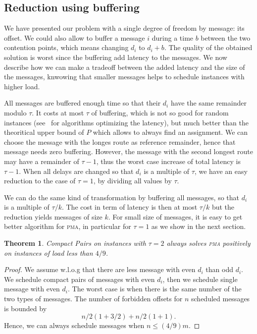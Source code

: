 \documentclass[10pt, conference, letterpaper]{IEEEtran}
\newtheorem{theorem}{Theorem}
\newcommand\pma{\textsc{pma}\xspace}
\begin{document}
\subsection{Reduction  using buffering}

We have presented our problem with a single degree of freedom by message: its
offset. We could also allow to buffer a message $i$ during a time $b$ between the two contention points, which means changing $d_i$ to $d_i + b$. The quality of the obtained solution is worst since the buffering add latency to the messages. We now describe how we can make a tradeoff between the added latency and the size of the messages, knwowing that smaller messages helps to schedule instances with higher load.


All messages are buffered enough time so that their $d_i$ have the same
remainder modulo $\tau$. It costs at most $\tau$ of buffering, which is not
so good for random instances (see~\cite{barth2018deterministic} for algorithms optimizing the latency), but much better than the theoritical upper bound of $P$ which allows to always find an assignment. We can choose the message with the longes route as reference remainder, hence that message needs zero buffering. However, the message with the second longest route may have a remainder of $\tau -1$, thus the worst case increase of total latency is $\tau -1$. When all delays are changed so that $d_i$ is a multiple of $\tau$, we have an
easy reduction to the case of $\tau = 1$, by dividing all values by $\tau$.

We can do the same kind of transformation by buffering all 
messages, so that $d_i$ is a multiple of $\tau / k$. The cost in term
of latency is then at most $\tau / k$ but the reduction yields messages of size $k$.
For small size of messages, it is easy to get better algorithm for \pma, in particular for $\tau =1$ as we show in the next section.
\begin{theorem}
Compact Pairs on instances with $\tau =2$ always solves \pma positively on instances of load less than $4/9$.
\end{theorem}
\begin{proof}
We assume w.l.o.g that there are less message with even $d_i$ than odd $d_i$.
We schedule compact pairs of messages with even $d_i$, then we schedule single message with even $d_i$. The worst case is when there is the same number of the two types of messages.
The number of forbidden offsets for $n$ scheduled messages is bounded by 
$$ n/2 (1 + 3/2) + n/2(1 + 1).$$
Hence, we can always schedule messages when $n \leq (4/9)m$.
\end{proof}
\end{document}
